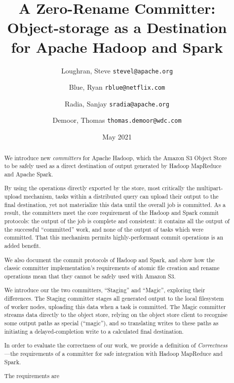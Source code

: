 \documentclass[conference]{IEEEtran}
\title{
    A Zero-Rename Committer:\\
    Object-storage as a Destination\\ for Apache Hadoop and Spark}
\author{
  Loughran, Steve
  \texttt{stevel@apache.org}\\
\and
  Blue, Ryan
  \texttt{rblue@netflix.com}\\
\and
  Radia, Sanjay
  \texttt{sradia@apache.org}
\and
  Demoor, Thomas
  \texttt{thomas.demoor@wdc.com}
}
\date{May 2021}
\begin{document}
\maketitle


\begin{abstract}

We introduce new \emph{committers} for Apache Hadoop, which
the Amazon S3 Object Store to be safely used as a direct destination of output generated
by Hadoop MapReduce and Apache Spark.

By using the operations directly exported by the store,
most critically the multipart-upload mechanism, tasks within a distributed
query can upload their output to the final destination,
yet not materialize this data until the overall job is committed.
As a result, the committers meet the core requirement of the Hadoop and Spark commit
protocols: the output of the job is complete and consistent: it contains
all the output of the successful ``committed'' work, and none of the output of
tasks which were committed.
That this mechanism permits highly-performant commit operations is an added benefit.

We also document the commit protocols of Hadoop and Spark, and show how the classic committer
implementation's requirements of atomic file creation and rename operations mean that they
cannot be safely used with Amazon S3.

We introduce our the two committers, ``Staging'' and ``Magic'', exploring their differences.
The Staging committer stages all generated output to the local filesystem of
worker nodes, uploading this data when a task is committed.
The Magic committer streams data directly to the object store, relying on the
object store client to recognise some output paths as special (``magic''), and
so translating writes to these paths as initiating a delayed-completion write
to a calculated final destination.

In order to evaluate the correctness of our work, we provide a definition
of \emph{Correctness} ---the requirements of a committer for safe integration
with Hadoop MapReduce and Spark.

The requirements are





\end{abstract}
\end{document}
